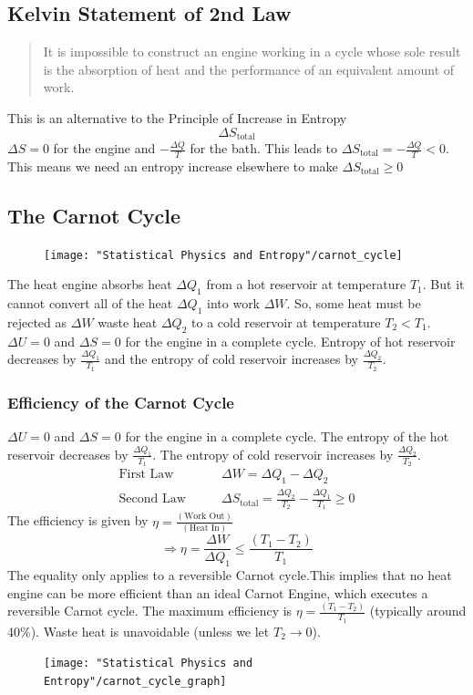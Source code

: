 \documentclass[british]{article}
\begin{document}
\subsection{Kelvin Statement of 2nd Law}
\begin{quote}
	It is impossible to construct an engine working in a cycle whose sole result is the absorption of heat and the performance of an equivalent amount of work.
\end{quote}
This is an alternative to the Principle of Increase in Entropy
\[
	\Delta S_\text{total}
\]
$\Delta S = 0$ for the engine and $-\frac{\Delta Q}{T}$ for the bath. This leads to $\Delta S_\text{total} = -\frac{\Delta Q}{T} < 0$. This means we need an entropy increase elsewhere to make $\Delta S_\text{total} \ge 0$

\subsection{The Carnot Cycle}
\begin{figure}[h]
	\begin{center}
		\texttt{[image: "Statistical Physics and Entropy"/carnot\_cycle]}
	\end{center}
\end{figure}
The heat engine absorbs heat $\Delta Q_1$ from a hot reservoir at temperature $T_1$. But it cannot convert all of the heat $\Delta Q_1$ into work $\Delta W$. So, some heat must be rejected as $\Delta W$ waste heat $\Delta Q_2$ to a cold reservoir at temperature $T_2<T_1$. $\Delta U = 0$ and $\Delta S = 0$ for the engine in a complete cycle. Entropy of hot reservoir decreases by $\frac{\Delta Q_1}{T_1}$ and the entropy of cold reservoir increases by $\frac{\Delta Q_2}{T_2}$.

\subsubsection{Efficiency of the Carnot Cycle}
$\Delta U = 0$ and $\Delta S = 0$ for the engine in a complete cycle. The entropy of the hot reservoir decreases by $\frac{\Delta Q_1}{T_1}$. The entropy of cold reservoir increases by $\frac{\Delta Q_2}{T_2}$. 
\begin{align*}
		\text{First Law} &\qquad \Delta W = \Delta Q_1 - \Delta Q_2 \\
		\text{Second Law} &\qquad \Delta S_\text{total} = \frac{\Delta Q_2}{T_2} - \frac{\Delta Q_1}{T_1} \ge 0
\end{align*}
The efficiency is given by $\eta = \frac{(\text{Work Out})}{(\text{Heat In})}$
\[
	\Rightarrow \eta = \frac{\Delta W}{\Delta Q_1} \le \frac{(T_1 - T_2)}{T_1}
\]
The equality only applies to a reversible Carnot cycle.This implies that no heat engine can be more efficient than an ideal Carnot Engine, which executes a reversible Carnot cycle. The maximum efficiency is $\eta = \frac{(T_1 - T_2)}{T_1}$ (typically around 40\%). Waste heat is unavoidable (unless we let $T_2 \rightarrow 0$).
\begin{figure}[h]
	\begin{center}
		\texttt{[image: "Statistical Physics and Entropy"/carnot\_cycle\_graph]}
	\end{center}
\end{figure}
\end{document}
